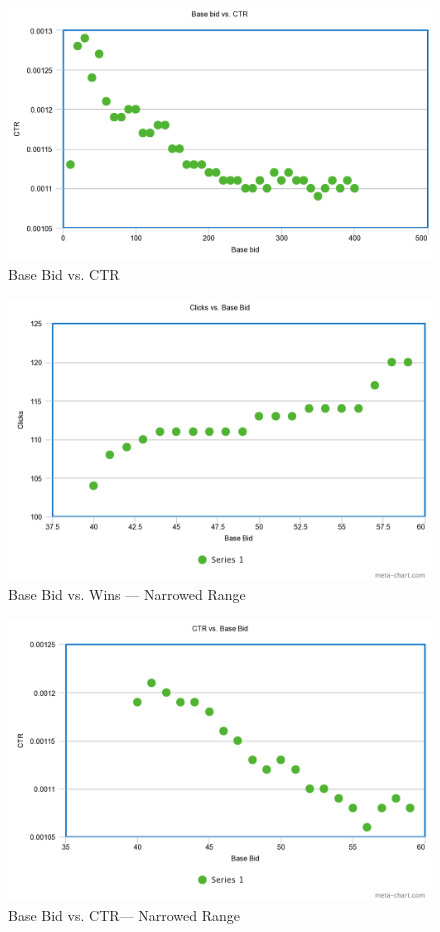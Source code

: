 \documentclass{sig-alternate-05-2015}
\begin{document}
\begin{figure}[h!]
  \includegraphics[width=\linewidth]{linear_CTR.png}
  \caption{Base Bid vs. CTR}
  \label{ctrbb}
\end{figure}

\begin{figure}[h!]
  \includegraphics[width=\linewidth]{linear_clicks_specific.png}
  \caption{Base Bid vs. Wins --- Narrowed Range}
  \label{clicksbbs}
\end{figure}

\begin{figure}[h!]
  \includegraphics[width=\linewidth]{linear_CTR_specific.png}
  \caption{Base Bid vs. CTR--- Narrowed Range}
  \label{ctrbbs}
\end{figure}
\end{document}
